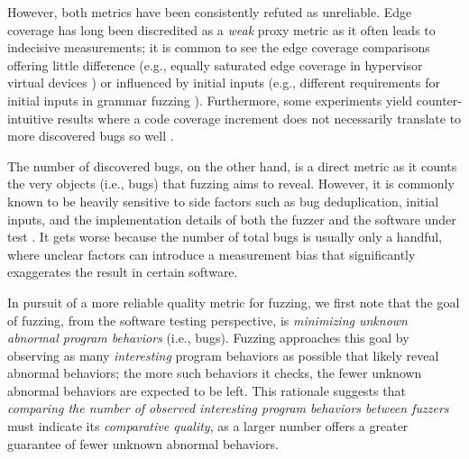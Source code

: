 \documentclass[letterpaper,twocolumn,10pt]{article}
\begin{document}
However, both metrics have been consistently refuted as unreliable. Edge
coverage has long been discredited as a \emph{weak} proxy metric as it
often leads to indecisive measurements; it is common to see the edge coverage
comparisons offering little difference (e.g., equally saturated edge coverage in
hypervisor virtual devices \cite{myung2022mundofuzz,sergej2021nyx}) or
influenced by initial inputs (e.g., different requirements for initial inputs in
grammar fuzzing \cite{chen2021polyglot}).
Furthermore, some experiments yield counter-intuitive results where a code
coverage increment does not necessarily translate to more discovered bugs so
well \cite{google-ai}.

The number of discovered bugs, on the other hand, is a direct metric as it
counts the very objects (i.e., bugs) that fuzzing aims to reveal. However, it is
commonly known to be heavily sensitive to side factors such as bug
deduplication, initial inputs, and the implementation details of both the fuzzer
and the software under test \cite{klees2018evaluating}. It gets worse because
the number of total bugs is usually only a handful,
where unclear factors can introduce a measurement bias that significantly
exaggerates the result in certain software.

In pursuit of a more reliable quality metric for fuzzing, we first note that the
goal of fuzzing, from the software testing perspective, is \emph{minimizing
unknown abnormal program behaviors} (i.e., bugs). Fuzzing approaches this goal
by observing as many \emph{interesting} program behaviors as possible that 
likely reveal abnormal behaviors; the more such behaviors it checks, the fewer
unknown abnormal behaviors are expected to be left.
%
This rationale suggests that \emph{comparing the number of observed interesting
program behaviors between fuzzers} must indicate its \emph{comparative
quality}, as a larger number offers a greater guarantee of fewer unknown
abnormal behaviors. 
\end{document}
